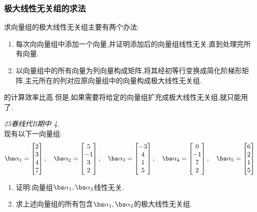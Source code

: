 \documentclass{ctexart}
\begin{document}
\subsubsection{极大线性无关组的求法}
\begin{hint}
    求向量组的极大线性无关组主要有两个办法:
    \begin{enumerate}[label={\color{blue}\tbf{(\arabic*)}}]
        \item 每次向向量组中添加一个向量,并证明添加后的向量组线性无关,直到处理完所有向量.
        \item 以向量组中的所有向量为列向量构成矩阵,将其经初等行变换成简化阶梯形矩阵,主元所在的列对应原向量组中的向量构成极大线性无关组.
    \end{enumerate}
    的计算效率比高.但是,如果需要将给定的向量组扩充成极大线性无关组,就只能用了.
\end{hint}
\begin{problem}\textit{25春线代B期中 4.}\\
    现有以下一向量组:
    \[\bs\alpha_1=\begin{bmatrix}
        2\\3\\4\\7
    \end{bmatrix},\quad\bs\alpha_2=\begin{bmatrix}
        5\\-1\\3\\2
    \end{bmatrix},\quad\bs\alpha_3=\begin{bmatrix}
        -3\\4\\1\\5
    \end{bmatrix},\quad\bs\alpha_4=\begin{bmatrix}
        0\\-1\\7\\2
    \end{bmatrix},\quad\bs\alpha_5=\begin{bmatrix}
        6\\2\\1\\5
    \end{bmatrix}\]
    \begin{enumerate}
        \item 证明:向量组$\bs\alpha_1,\bs\alpha_2$线性无关.
        \item 求上述向量组的所有包含$\bs\alpha_1,\bs\alpha_2$的极大线性无关组.
    \end{enumerate}
\end{problem}
\end{document}
